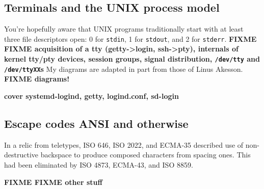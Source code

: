 \subsection{Terminals and the UNIX process model}
\label{sec:unixprocs}

You're hopefully aware that UNIX programs traditionally start with at least
three file descriptors open: 0 for \texttt{stdin}, 1 for \texttt{stdout}, and 2
for \texttt{stderr}. 
\textbf{FIXME FIXME acquisition of a tty (getty->login, ssh->pty),
  internals of kernel tty/pty devices, session groups, signal distribution,
  \texttt{/dev/tty} and \texttt{/dev/ttyXX}s}
My diagrams are adapted in part from those of Linus Akesson\cite{ttydemystified}.
\textbf{FIXME diagrams!}

\textbf{cover systemd-logind, getty, logind.conf, sd-login}
\subsection{Escape codes ANSI and otherwise}
\label{sec:escapes}

In a relic from teletypes, ISO 646, ISO 2022, and ECMA-35 described use of
non-destructive backspace to produce composed characters from spacing ones.
This had been eliminated by ISO 4873, ECMA-43, and ISO 8859.

\textbf{FIXME FIXME other stuff}
